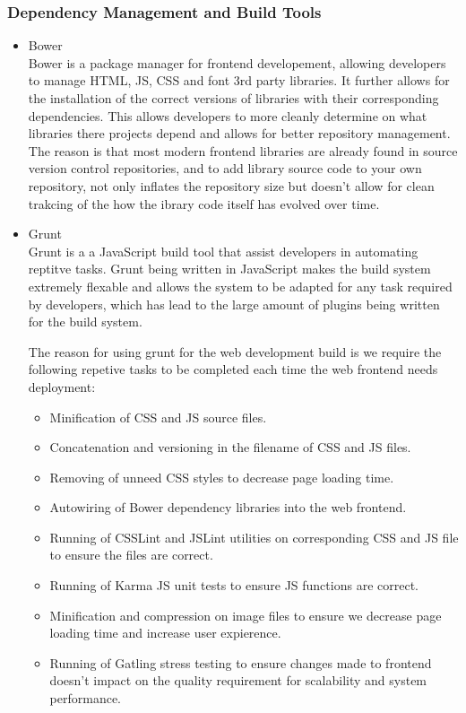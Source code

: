 \documentclass[a4paper,10pt]{article}
\begin{document}
\subsubsection{Dependency Management and Build Tools}
	\begin{itemize}
		\item Bower\\
			Bower is a package manager for frontend developement, allowing developers to manage HTML, JS, CSS and font 3rd party libraries.  It further allows for the installation of the correct versions of libraries with their corresponding dependencies. This allows developers to more cleanly determine on what libraries there projects depend and allows for better repository management. The reason is that most modern frontend libraries are already found in source version control repositories, and to add library source code to your own repository, not only inflates the repository size but doesn't allow for clean trakcing of the how the ibrary code itself has evolved over time.

		\item Grunt\\
			Grunt is a a JavaScript build tool that assist developers in automating reptitve tasks. Grunt being written in JavaScript makes the build system extremely flexable and allows the system to be adapted for any task required by developers, which has lead to the large amount of plugins being written for the build system.

			The reason for using grunt for the web development build is we require the following repetive tasks to be completed each time the web frontend needs deployment:
			\begin{itemize}
				\item Minification of CSS and JS source files.
				\item Concatenation and versioning in the filename of CSS and JS files.
				\item Removing of unneed CSS styles to decrease page loading time.
				\item Autowiring of Bower dependency libraries into the web frontend.
				\item Running of CSSLint and JSLint utilities on corresponding CSS and JS file to ensure the files are correct.
				\item Running of Karma JS unit tests to ensure JS functions are correct.
				\item Minification and compression on image files to ensure we decrease page loading time and increase user expierence.
				\item Running of Gatling stress testing to ensure changes made to frontend doesn't impact on the quality requirement for scalability and system performance.
			\end{itemize}
	\end{itemize}
\end{document}
